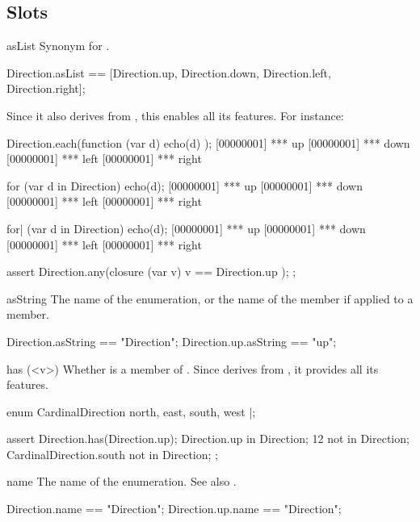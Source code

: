 \subsection{Slots}
\begin{urbiscriptapi}
\item[asList]
  Synonym for .
\begin{urbiassert}
Direction.asList
  == [Direction.up, Direction.down, Direction.left, Direction.right];
\end{urbiassert}

  Since it also derives from , this enables all
  its features.  For instance:

\begin{urbiscript}
Direction.each(function (var d) { echo(d) });
[00000001] *** up
[00000001] *** down
[00000001] *** left
[00000001] *** right

for (var d in Direction)
  echo(d);
[00000001] *** up
[00000001] *** down
[00000001] *** left
[00000001] *** right

for| (var d in Direction)
  echo(d);
[00000001] *** up
[00000001] *** down
[00000001] *** left
[00000001] *** right

assert
{
  Direction.any(closure (var v) { v == Direction.up });
};
\end{urbiscript}


\item[asString]
  The name of the enumeration, or the name of the member if applied to a
  member.
\begin{urbiassert}
Direction.asString    == "Direction";
Direction.up.asString == "up";
\end{urbiassert}


\item[has](<v>)%
  Whether  is a member of \this.  Since 
  derives from , it provides all its features.
\begin{urbiscript}
enum CardinalDirection { north, east, south, west }|;

assert
{
  Direction.has(Direction.up);
  Direction.up in Direction;
  12 not in Direction;
  CardinalDirection.south not in Direction;
};
\end{urbiscript}


\item[name]
  The name of the enumeration.  See also .
\begin{urbiassert}
Direction.name    == "Direction";
Direction.up.name == "Direction";
\end{urbiassert}



\end{urbiscriptapi}
